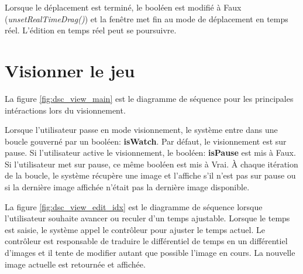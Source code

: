 Lorsque le déplacement est terminé, le booléen est modifié à Faux (\textit{unsetRealTimeDrag()}) et la fenêtre met fin au mode de déplacement en temps réel.
L'édition en temps réel peut se poursuivre.

\section{Visionner le jeu}
\label{sec:visionner_jeu}


La figure \ref{fig:dsc_view_main} est le diagramme de séquence pour les principales intéractions lors du visionnement.

Lorsque l'utilisateur passe en mode visionnement, le système entre dans une boucle gouverné par un booléen: \textbf{isWatch}.
Par défaut, le visionnement est sur pause.
Si l'utilisateur active le visionnement, le booléen: \textbf{isPause} est mis à Faux.
Si l'utilisateur met sur pause, ce même booléen est mis à Vrai.
À chaque itération de la boucle, le système récupère une image et l'affiche s'il n'est pas sur pause ou si la dernière image affichée n'était pas la dernière image disponible.


La figure \ref{fig:dsc_view_edit_idx} est le diagramme de séquence lorsque l'utilisateur souhaite avancer ou reculer d'un temps ajustable.
Lorsque le temps est saisie, le système appel le contrôleur pour ajuster le temps actuel.
Le contrôleur est responsable de traduire le différentiel de temps en un différentiel d'images et il tente de modifier autant que possible l'image en cours.
La nouvelle image actuelle est retournée et affichée.


